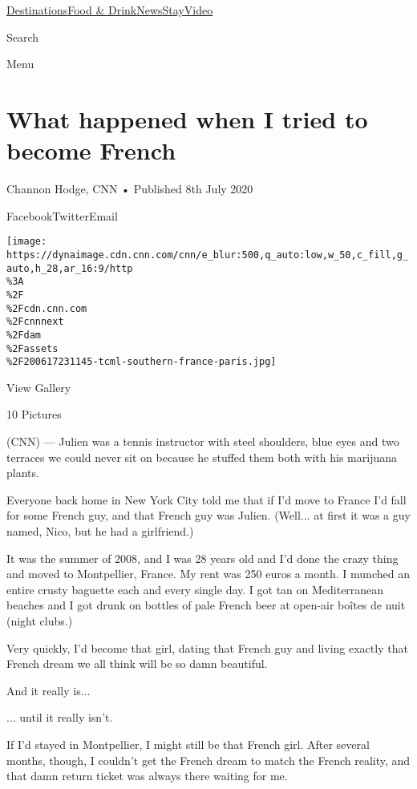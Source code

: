 \href{/}{}\href{/travel}{}

\href{/travel/destinations}{Destinations}\href{/travel/food-and-drink}{Food
\&
Drink}\href{/travel/news}{News}\href{/travel/stay}{Stay}\href{/travel/videos}{Video}

Search

Menu

\hypertarget{what-happened-when-i-tried-to-become-french}{%
\section{What happened when I tried to become
French}\label{what-happened-when-i-tried-to-become-french}}

Channon Hodge, CNN • Published 8th July 2020

FacebookTwitterEmail

\texttt{[image: https://dynaimage.cdn.cnn.com/cnn/e\_blur:500,q\_auto:low,w\_50,c\_fill,g\_auto,h\_28,ar\_16:9/http\\\%3A\\\%2F\\\%2Fcdn.cnn.com\\\%2Fcnnnext\\\%2Fdam\\\%2Fassets\\\%2F200617231145-tcml-southern-france-paris.jpg]}

View Gallery

10 Pictures

(CNN) --- Julien was a tennis instructor with steel shoulders, blue eyes
and two terraces we could never sit on because he stuffed them both with
his marijuana plants.

Everyone back home in New York City told me that if I'd move to France
I'd fall for some French guy, and that French guy was Julien. (Well...
at first it was a guy named, Nico, but he had a girlfriend.)

It was the summer of 2008, and I was 28 years old and I'd done the crazy
thing and moved to Montpellier, France. My rent was 250 euros a month. I
munched an entire crusty baguette each and every single day. I got tan
on Mediterranean beaches and I got drunk on bottles of pale French beer
at open-air boîtes de nuit (night clubs.)

Very quickly, I'd become that girl, dating that French guy and living
exactly that French dream we all think will be so damn beautiful.

And it really is...

... until it really isn't.

If I'd stayed in Montpellier, I might still be that French girl. After
several months, though, I couldn't get the French dream to match the
French reality, and that damn return ticket was always there waiting for
me.

